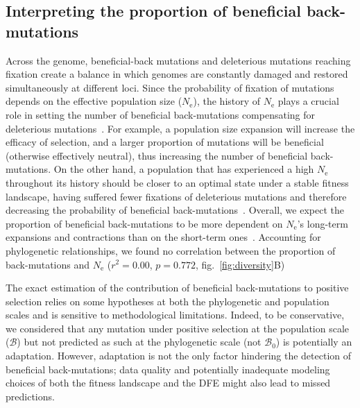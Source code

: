 \documentclass[9pt,twocolumn,twoside,lineno]{pnas-new}
\newcommand{\Ne}{N_{\text{e}}}
\newcommand{\SphyBen}{\mathcal{B}_0}
\newcommand{\SpopBen}{\mathcal{B}}
\begin{document}
\subsection*{Interpreting the proportion of beneficial back-mutations}

Across the genome, beneficial-back mutations and deleterious mutations reaching fixation create a balance in which genomes are constantly damaged and restored simultaneously at different loci.
Since the probability of fixation of mutations depends on the effective population size ($\Ne$), the history of $\Ne$ plays a crucial role in setting the number of beneficial back-mutations compensating for deleterious mutations~\cite{latrille_inferring_2021}.
For example, a population size expansion will increase the efficacy of selection, and a larger proportion of mutations will be beneficial (otherwise effectively neutral), thus increasing the number of beneficial back-mutations.
On the other hand, a population that has experienced a high $\Ne$ throughout its history should be closer to an optimal state under a stable fitness landscape, having suffered fewer fixations of deleterious mutations and therefore decreasing the probability of beneficial back-mutations~\cite{huber_determining_2017}.
Overall, we expect the proportion of beneficial back-mutations to be more dependent on $\Ne$’s long-term expansions and contractions than on the short-term ones~\cite{charlesworth_other_2007,huber_determining_2017}.
Accounting for phylogenetic relationships, we found no correlation between the proportion of back-mutations and $\Ne$ ($r^2=0.00$, $p=0.772$, fig.~\ref{fig:diversity}B)

The exact estimation of the contribution of beneficial back-mutations to positive selection relies on some hypotheses at both the phylogenetic and population scales and is sensitive to methodological limitations.
Indeed, to be conservative, we considered that any mutation under positive selection at the population scale ($\SpopBen$) but not predicted as such at the phylogenetic scale (not $\SphyBen$) is potentially an adaptation.
However, adaptation is not the only factor hindering the detection of beneficial back-mutations; data quality and potentially inadequate modeling choices of both the fitness landscape and the DFE might also lead to missed predictions.
\end{document}
